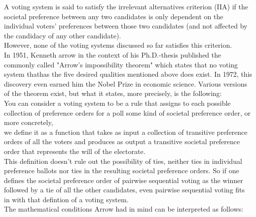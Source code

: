 A voting system is said to satisfy the irrelevant alternatives criterion (IIA) if the societal preference between any two candidates is only dependent on the individual voters' preferences between those two candidates (and not affected by the candidacy of any other candidate). \\
However, none of the voting systems discussed so far satisfies this criterion. \\
In 1951, Kenneth arrow in the context of his Ph.D.-thesis published the commonly called "Arrow's impossibility theorem" which states that no voting system thathas the five desired qualities mentioned above does exist. In 1972, this discovery even earned him the Nobel Prize in economic science. Various versions of the theorem exist, but what it states, more precisely, is the following: \\
You can consider a voting system to be a rule that assigns to each possible collection of preference orders for a poll some kind of societal preference order, or more concretely, \\
we define it as a function that takes as input a collection of transitive preference orders of all the voters and produces as output a transitive societal preference order that represents the will of the electorate. \\
This definition doesn't rule out the possibility of ties, neither ties in individual preference ballots nor ties in the resulting societal preference orders. So if one defines the societal preference order of pairwise sequential voting as the winner followed by a tie of all the other candidates, even pairwise sequential voting fits in with that defintion of a voting system. \\
The mathematical conditions Arrow had in mind can be interpreted as follows: 
